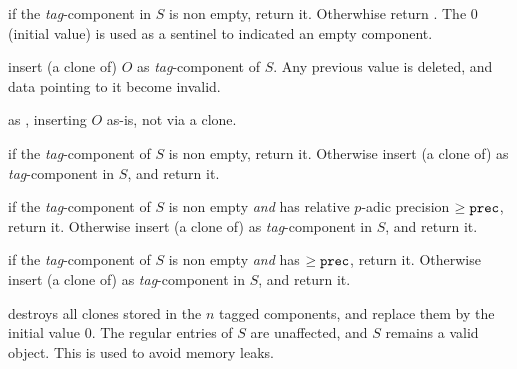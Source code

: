  if the \emph{tag}-component in $S$
is non empty, return it. Otherwhise return . The  $0$
(initial value) is used as a sentinel to indicated an empty component.

 insert (a clone of) $O$
as \emph{tag}-component of $S$. Any previous value is deleted, and
data pointing to it become invalid.

 as ,
inserting $O$ as-is, not via a clone.

 if the
\emph{tag}-component of $S$ is non empty, return it. Otherwise insert
(a clone of)  as \emph{tag}-component in $S$, and return it.

if the \emph{tag}-component of $S$ is non empty \emph{and} has relative
$p$-adic precision $\geq {\tt prec}$, return it. Otherwise insert (a clone
of)  as \emph{tag}-component in $S$, and return it.

 if the \emph{tag}-component of $S$ is non empty \emph{and} has
 $\geq {\tt prec}$, return it. Otherwise insert (a clone of)
 as \emph{tag}-component in $S$, and return it.

 destroys all clones stored in the $n$ tagged
components, and replace them by the initial value $0$. The regular entries of
$S$ are unaffected, and $S$ remains a valid object. This is used to
avoid memory leaks.
